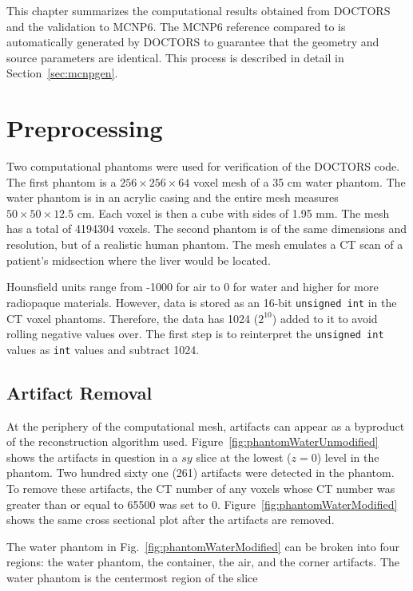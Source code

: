
This chapter summarizes the computational results obtained from DOCTORS and the validation to MCNP6. The MCNP6 reference compared to is automatically generated by DOCTORS to guarantee that the geometry and source parameters are identical. This process is described in detail in Section~\ref{sec:mcnpgen}.

\section{Preprocessing}
Two computational phantoms were used for verification of the DOCTORS code. The first phantom is a $256 \times 256 \times 64$ voxel mesh of a 35 cm water phantom. The water phantom is in an acrylic casing and the entire mesh measures $50 \times 50 \times 12.5$ cm. Each voxel is then a cube with sides of 1.95 mm. The mesh has a total of 4194304 voxels. The second phantom is of the same dimensions and resolution, but of a realistic human phantom. The mesh emulates a CT scan of a patient's midsection where the liver would be located.

Hounsfield units range from -1000 for air to 0 for water and higher for more radiopaque materials. However, data is stored as an 16-bit \texttt{unsigned int} in the CT voxel phantoms. Therefore, the data has 1024 ($2^{10}$) added to it to avoid rolling negative values over. The first step is to reinterpret the \texttt{unsigned int} values as \texttt{int} values and subtract 1024.

\subsection{Artifact Removal}
At the periphery of the computational mesh, artifacts can appear as a byproduct of the reconstruction algorithm used. Figure~\ref{fig:phantomWaterUnmodified} shows the artifacts in question in a $sy$ slice at the lowest ($z = 0$) level in the phantom. Two hundred sixty one (261) artifacts were detected in the phantom. To remove these artifacts, the CT number of any voxels whose CT number was greater than or equal to 65500 was set to 0. Figure~\ref{fig:phantomWaterModified} shows the same cross sectional plot after the artifacts are removed.

The water phantom in Fig.~\ref{fig:phantomWaterModified} can be broken into four regions: the water phantom, the container, the air, and the corner artifacts. The water phantom is the centermost region of the slice

